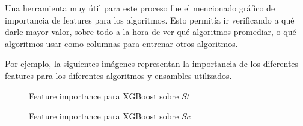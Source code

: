 \documentclass[a4paper, 12pt]{article}
\begin{document}
Una herramienta muy útil para este proceso fue el mencionado gráfico de importancia de features para los algoritmos. Esto permitía ir verificando a qué darle mayor valor, sobre todo a la hora de ver qué algoritmos promediar, o qué algoritmos usar como columnas para entrenar otros algoritmos.

Por ejemplo, la siguientes imágenes representan la importancia de los diferentes features para los diferentes algoritmos y ensambles utilizados.


\begin{figure}[H]
    \centering
    \caption{Feature importance para XGBoost sobre $St$}
\end{figure}

\begin{figure}[H]
    \centering
    \caption{Feature importance para XGBoost sobre $Sc$}
\end{figure}
\end{document}
